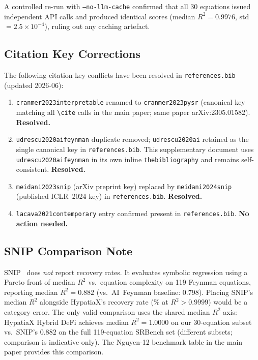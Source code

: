 \documentclass[twoside,11pt]{article}
\begin{document}
A controlled re-run with \texttt{--no-llm-cache} confirmed that all
30 equations issued independent API calls and produced identical scores
(median $R^2=0.9976$, std $=2.5\times10^{-4}$), ruling out any
caching artefact.

\subsection*{Citation Key Corrections}

The following citation key conflicts have been resolved in \texttt{references.bib}
(updated 2026-06):

\begin{enumerate}
  \item \texttt{cranmer2023interpretable} renamed to \texttt{cranmer2023pysr}
        (canonical key matching all \texttt{\textbackslash cite} calls in the main paper;
        same paper arXiv:2305.01582). \textbf{Resolved.}
  \item \texttt{udrescu2020aifeynman} duplicate removed; \texttt{udrescu2020ai}
        retained as the single canonical key in \texttt{references.bib}.
        This supplementary document uses \texttt{udrescu2020aifeynman} in its own
        inline \texttt{thebibliography} and remains self-consistent. \textbf{Resolved.}
  \item \texttt{meidani2023snip} (arXiv preprint key) replaced by
        \texttt{meidani2024snip} (published ICLR~2024 key) in
        \texttt{references.bib}. \textbf{Resolved.}
  \item \texttt{lacava2021contemporary} entry confirmed present in
        \texttt{references.bib}. \textbf{No action needed.}
\end{enumerate}

\subsection*{SNIP Comparison Note}

SNIP~\citep{meidani2024snip} does \emph{not} report recovery rates.
It evaluates symbolic regression using a Pareto front of median
$R^2$ vs.\ equation complexity on 119 Feynman equations, reporting
median $R^2 = 0.882$ (vs.\ AI~Feynman baseline: $0.798$).
Placing SNIP's median $R^2$ alongside HypatiaX's recovery rate
(\% at $R^2>0.9999$) would be a category error.
The only valid comparison uses the shared median $R^2$ axis:
HypatiaX Hybrid DeFi achieves median $R^2 = 1.0000$ on our 30-equation
subset vs.\ SNIP's $0.882$ on the full 119-equation SRBench set
(different subsets; comparison is indicative only).
The Nguyen-12 benchmark table in the main paper provides this comparison.
\end{document}
